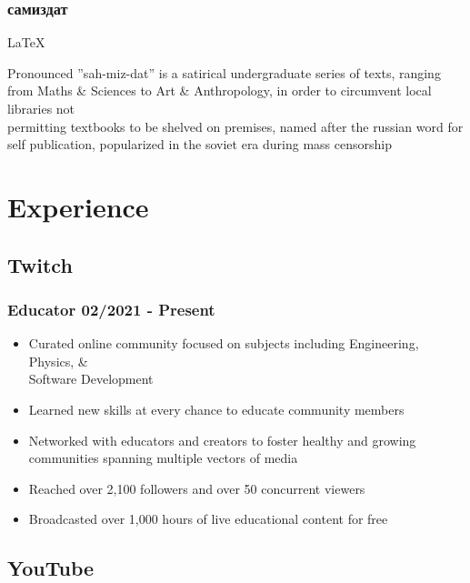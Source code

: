 \documentclass[10pt]{article} %
\begin{document}
\subsubsection{самиздат}
\begin{description}[style=multiline, leftmargin=2.75cm]
    \item[Technologies] {LaTeX}
    \item[Purpose] {Pronounced ''sah-miz-dat'' is a satirical undergraduate series 
        of texts, ranging from Maths \& Sciences to Art \& Anthropology, in order 
        to circumvent local libraries not \\ permitting textbooks to be shelved 
        on premises, named after the russian word for self publication, 
        popularized in the soviet era during mass censorship}  
\end{description}

\section{Experience}
\subsection{Twitch}
\subsubsection{Educator \hfill 02/2021 - Present}
\begin{itemize}
    \item {Curated online community focused on subjects including Engineering,  
        Physics, \& \\ Software Development}
    \item {Learned new skills at every chance to educate community members}
    \item {Networked with educators and creators to foster healthy and growing 
        communities spanning multiple vectors of media}
    \item {Reached over 2,100 followers and over 50 concurrent viewers}
    \item {Broadcasted over 1,000 hours of live educational content for free}
\end{itemize}

\subsection{YouTube}
\end{document}
